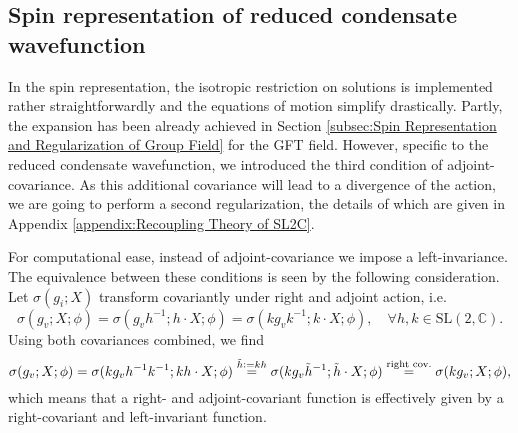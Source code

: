 \documentclass[11pt,a4paper]{article}
\newcommand{\C}{\mathbb C}
\newcommand{\SL}{\text{SL$(2,\C)$}}
\newcommand{\defeq}{\vcentcolon=}
\begin{document}
\subsection{Spin representation of reduced condensate wavefunction}\label{subsec:Spin Representation of Condensate Wavefunction}

In the spin representation, the isotropic restriction on solutions is implemented rather straightforwardly and the equations of motion simplify drastically. Partly, the expansion has been already achieved in Section \ref{subsec:Spin Representation and Regularization of Group Field} for the GFT field. However, specific to the reduced condensate wavefunction, we introduced the third condition of adjoint-covariance. As this additional covariance will lead to a divergence of the action, we are going to perform a second regularization, the details of which are given in Appendix \ref{appendix:Recoupling Theory of SL2C}.

For computational ease, instead of adjoint-covariance we impose a left-invariance. The equivalence between these conditions is seen by the following consideration. Let $\sigma(g_i;X)$ transform covariantly under right and adjoint action, i.e.
%
\begin{equation}
\sigma(g_v;X;\phi)
=
\sigma(g_v h^{-1}; h\cdot X;\phi)
=
\sigma(kg_v k^{-1}; k\cdot X;\phi),\quad \forall h,k\in\SL.
\end{equation}
%
Using both covariances combined, we find
%
\begin{equation}
\sigma(g_v;X;\phi)
=
\sigma(kg_v h^{-1} k^{-1}; kh\cdot X;\phi)
\overset{\tilde{h}
\defeq kh}{=}\sigma(kg_v\tilde{h}^{-1}; \tilde{h}\cdot X;\phi )
\overset{\text{right cov.}}{=}
\sigma(k g_v; X;\phi),
\end{equation}
%
which means that a right- and adjoint-covariant function is effectively given by a right-covariant and left-invariant function. 
\end{document}

